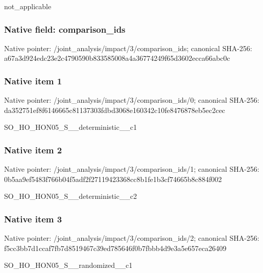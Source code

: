 \documentclass[10pt,a4paper]{article}
\begin{document}
\begingroup\raggedright\sloppy not\_\allowbreak{}applicable\par\endgroup

\subsubsection{Native field: comparison\_\allowbreak{}ids}
Native pointer: /joint\_\allowbreak{}analysis/impact/3/comparison\_\allowbreak{}ids; canonical SHA-256: a67a3d924edc23e2c4790590b833585008a4a36774249f65d3602ecca66abc0c

\subsubsection{Native item 1}
Native pointer: /joint\_\allowbreak{}analysis/impact/3/comparison\_\allowbreak{}ids/0; canonical SHA-256: da352751ef8f6146665c81137303fdbd3068e160342c10fe8476878eb5ec2cec

\begingroup\raggedright\sloppy SO\_\allowbreak{}HO\_\allowbreak{}HON05\_\allowbreak{}S\_\allowbreak{}\_\allowbreak{}deterministic\_\allowbreak{}\_\allowbreak{}c1\par\endgroup

\subsubsection{Native item 2}
Native pointer: /joint\_\allowbreak{}analysis/impact/3/comparison\_\allowbreak{}ids/1; canonical SHA-256: 0b5aa9ef5483f766b04f5adf2f27119423368cc8b1fe1b3cf74665b8c884f002

\begingroup\raggedright\sloppy SO\_\allowbreak{}HO\_\allowbreak{}HON05\_\allowbreak{}S\_\allowbreak{}\_\allowbreak{}deterministic\_\allowbreak{}\_\allowbreak{}c2\par\endgroup

\subsubsection{Native item 3}
Native pointer: /joint\_\allowbreak{}analysis/impact/3/comparison\_\allowbreak{}ids/2; canonical SHA-256: f5cc3bb7d1ccaf7fb7d8519467c39ed785646f0b7fbbb4d9e3a5e657eca26409

\begingroup\raggedright\sloppy SO\_\allowbreak{}HO\_\allowbreak{}HON05\_\allowbreak{}S\_\allowbreak{}\_\allowbreak{}randomized\_\allowbreak{}\_\allowbreak{}c1\par\endgroup
\end{document}

